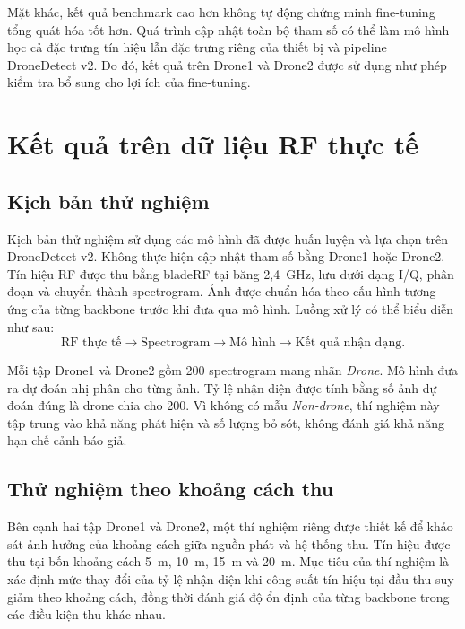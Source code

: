 \documentclass[../DoAn.tex]{subfiles}
\begin{document}
Mặt khác, kết quả benchmark cao hơn không tự động chứng minh fine-tuning tổng quát hóa tốt hơn. Quá trình cập nhật toàn bộ tham số có thể làm mô hình học cả đặc trưng tín hiệu lẫn đặc trưng riêng của thiết bị và pipeline DroneDetect v2. Do đó, kết quả trên Drone1 và Drone2 được sử dụng như phép kiểm tra bổ sung cho lợi ích của fine-tuning.

\section{Kết quả trên dữ liệu RF thực tế}

\subsection{Kịch bản thử nghiệm}

Kịch bản thử nghiệm sử dụng các mô hình đã được huấn luyện và lựa chọn trên DroneDetect v2. Không thực hiện cập nhật tham số bằng Drone1 hoặc Drone2. Tín hiệu RF được thu bằng bladeRF tại băng 2,4~GHz, lưu dưới dạng I/Q, phân đoạn và chuyển thành spectrogram. Ảnh được chuẩn hóa theo cấu hình tương ứng của từng backbone trước khi đưa qua mô hình. Luồng xử lý có thể biểu diễn như sau:
\begin{equation}
    \text{RF thực tế}
    \longrightarrow
    \text{Spectrogram}
    \longrightarrow
    \text{Mô hình}
    \longrightarrow
    \text{Kết quả nhận dạng}.
\end{equation}

Mỗi tập Drone1 và Drone2 gồm 200 spectrogram mang nhãn \textit{Drone}. Mô hình đưa ra dự đoán nhị phân cho từng ảnh. Tỷ lệ nhận diện được tính bằng số ảnh dự đoán đúng là drone chia cho 200. Vì không có mẫu \textit{Non-drone}, thí nghiệm này tập trung vào khả năng phát hiện và số lượng bỏ sót, không đánh giá khả năng hạn chế cảnh báo giả.


\subsection{Thử nghiệm theo khoảng cách thu}

Bên cạnh hai tập Drone1 và Drone2, một thí nghiệm riêng được thiết kế để khảo sát ảnh hưởng của khoảng cách giữa nguồn phát và hệ thống thu. Tín hiệu được thu tại bốn khoảng cách 5~m, 10~m, 15~m và 20~m. Mục tiêu của thí nghiệm là xác định mức thay đổi của tỷ lệ nhận diện khi công suất tín hiệu tại đầu thu suy giảm theo khoảng cách, đồng thời đánh giá độ ổn định của từng backbone trong các điều kiện thu khác nhau.
\end{document}
